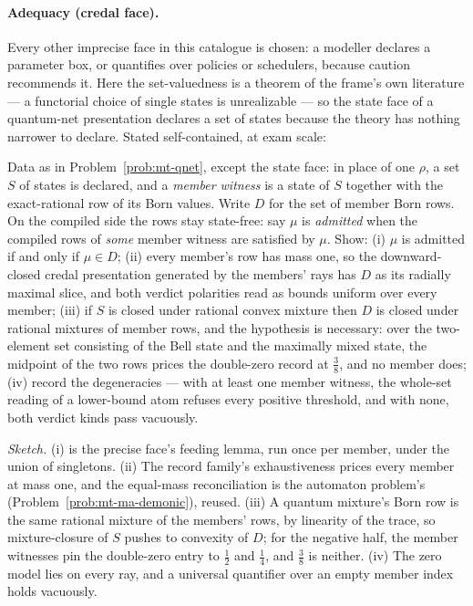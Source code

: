 \paragraph{Adequacy (credal face).} Every other imprecise face in
this catalogue is chosen: a modeller declares a parameter box, or
quantifies over policies or schedulers, because caution recommends
it. Here the set-valuedness is a theorem of the frame's own
literature --- a functorial choice of single states is unrealizable
\cite{brunetti01,fewster11} --- so the state face of a quantum-net
presentation declares a set of states because the theory has nothing
narrower to declare. Stated self-contained, at exam scale:

\begin{problem}
\label{prob:mt-qnet-credal}
Data as in Problem~\ref{prob:mt-qnet}, except the state face: in
place of one $\rho$, a set $S$ of states is declared, and a
\emph{member witness} is a state of $S$ together with the
exact-rational row of its Born values. Write $D$ for the set of
member Born rows. On the compiled side the rows stay state-free: say
$\mu$ is \emph{admitted} when the compiled rows of \emph{some}
member witness are satisfied by $\mu$. Show: (i) $\mu$ is admitted
if and only if $\mu \in D$; (ii) every member's row has mass one, so
the downward-closed credal presentation generated by the members'
rays has $D$ as its radially maximal slice, and both verdict
polarities read as bounds uniform over every member; (iii) if $S$ is
closed under rational convex mixture then $D$ is closed under
rational mixtures of member rows, and the hypothesis is
necessary: over the two-element set consisting of the Bell state
and the maximally mixed state, the midpoint of the two rows prices
the double-zero record at $\tfrac38$, and no member does; (iv)
record the degeneracies --- with at least one member witness, the
whole-set reading of a lower-bound atom refuses every positive
threshold, and with none, both verdict kinds pass vacuously.
\end{problem}

\emph{Sketch.} (i) is the precise face's feeding lemma, run once per
member, under the union of singletons. (ii) The record family's
exhaustiveness prices every member at mass one, and the equal-mass
reconciliation is the automaton problem's
(Problem~\ref{prob:mt-ma-demonic}), reused. (iii) A quantum
mixture's Born row is the same rational mixture of the members'
rows, by linearity of the trace, so mixture-closure of $S$ pushes to
convexity of $D$; for the negative half, the member witnesses pin
the double-zero entry to $\tfrac12$ and $\tfrac14$, and $\tfrac38$
is neither. (iv) The zero model lies on every ray, and a universal
quantifier over an empty member index holds vacuously.

